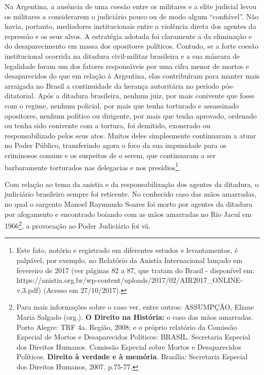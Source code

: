 Na Argentina, a ausência de uma coesão entre os militares e a elite
judicial levou os militares a considerarem o judiciário pouco ou de modo
algum ``confiável''. Não havia, portanto, mediadores institucionais
entre a violência direta dos agentes da repressão e os seus alvos. A
estratégia adotada foi claramente a da eliminação e do desaparecimento
em massa dos opositores políticos. Contudo, se a forte coesão
institucional ocorrida na ditadura civil-militar brasileira e a sua
máscara de legalidade foram um dos fatores responsáveis por uma cifra
menor de mortos e desaparecidos do que em relação à Argentina, elas
contribuíram para manter mais arraigada no Brasil a continuidade da
herança autoritária no período pós-ditatorial. Após a ditadura
brasileira, nenhum juiz, por mais conivente que fosse com o regime,
nenhum policial, por mais que tenha torturado e assassinado opositores,
nenhum político ou dirigente, por mais que tenha aprovado, ordenado ou
tenha sido conivente com a tortura, foi demitido, exonerado ou
responsabilizado pelos seus atos. Muitos deles simplesmente continuaram
a atuar no Poder Público, transferindo agora o foco da sua impunidade
para os criminosos comuns e os suspeitos de o serem, que continuaram a
ser barbaramente torturados nas delegacias e nos presídios\footnote{Este
  fato, notório e registrado em diferentes estudos e levantamentos, é
  palpável, por exemplo, no Relatório da Anistia Internacional lançado
  em fevereiro de 2017 (ver páginas 82 a 87, que tratam do Brasil -
  disponível em:
  https://anistia.org.br/wp-content/uploads/2017/02/AIR2017\_ONLINE-v.3.pdf)
  (Acesso em 27/10/2017).}.

Com relação ao tema da anistia e da responsabilização dos agentes da
ditadura, o judiciário brasileiro sempre foi reticente. No conhecido
caso das mãos amarradas, no qual o sargento Manoel Raymundo Soares foi
morto por agentes da ditadura por afogamento e encontrado boiando com as
mãos amarradas no Rio Jacuí em 1966\footnote{Para mais informações sobre
  o caso ver, entre outros: ASSUMPÇÃO, Eliane Maria Salgado (org.).
  \textbf{O Direito na História:} o caso das mãos amarradas. Porto
  Alegre: TRF 4a. Região, 2008; e o próprio relatório da Comissão
  Especial de Mortos e Desaparecidos Políticos: BRASIL. Secretaria
  Especial dos Direitos Humanos. Comissão Especial sobre Mortos e
  Desaparecidos Políticos. \textbf{Direito à verdade e à memória}.
  Brasília: Secretaria Especial dos Direitos Humanos, 2007. p.75-77.}, a
provocação ao Poder Judiciário foi vã.


